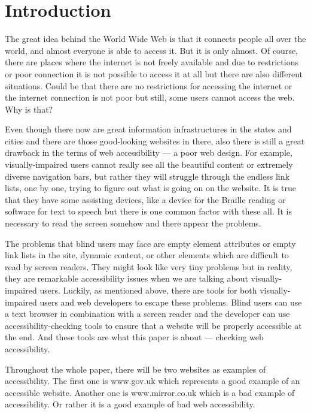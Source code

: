 %
%
% 
% 


\chapter{Introduction}

The great idea behind the World Wide Web is that it connects people
all over the world, and almost everyone is able to access it. But it
is only almost. Of course, there are places where the internet is not
freely available and due to restrictions or poor connection it is not
possible to access it at all but there are also different
situations. Could be that there are no restrictions for accessing the
internet or the internet connection is not poor but still, some users
cannot access the web. Why is that?

Even though there now are great information infrastructures in the
states and cities and there are those good-looking websites in there,
also there is still a great drawback in the terms of web accessibility
--- a poor web design. For example, visually-impaired users cannot really
see all the beautiful content or extremely diverse navigation bars,
but rather they will struggle through the endless link lists, one by
one, trying to figure out what is going on on the website. It is true
that they have some assisting devices, like a device for the Braille
reading or software for text to speech but there is one common factor
with these all. It is necessary to read the screen somehow and there
appear the problems.

The problems that blind users may face are empty element attributes or
empty link lists in the site, dynamic content, or other elements which
are difficult to read by screen readers. They might look like very
tiny problems but in reality, they are remarkable accessibility issues
when we are talking about visually-impaired users. Luckily, as
mentioned above, there are tools for both visually-impaired users and
web developers to escape these problems. Blind users can use a text
browser in combination with a screen reader and the developer can use
accessibility-checking tools to ensure that a website will be properly
accessible at the end. And these tools are what this paper is about ---
checking web accessibility.

Throughout the whole paper, there will be two websites as examples of
accessibility. The first one is www.gov.uk which represents a good
example of an accessible website. Another one is www.mirror.co.uk
which is a bad example of accessibility. Or rather it is
a good example of bad web accessibility.


